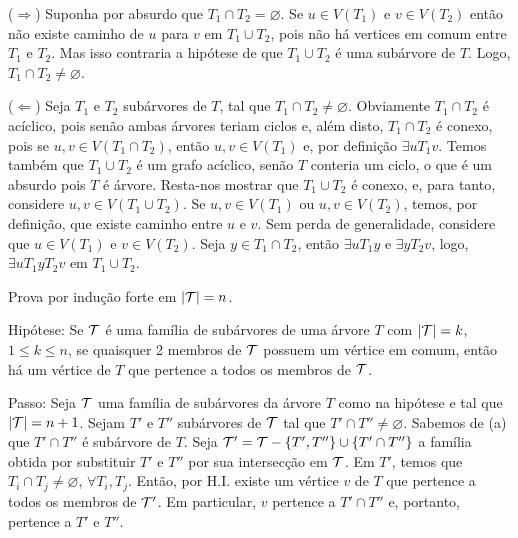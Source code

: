 
($\Rightarrow$) Suponha por absurdo que $T_1 \cap T_2 = \varnothing$.
%
Se $u \in V(T_1)$ e $v \in V(T_2)$ então não existe caminho de $u$ para $v$ em $T_1 \cup T_2$, pois não há vertices em comum entre $T_1$ e $T_2$.
%
Mas isso contraria a hipótese de que $T_1 \cup T_2$ é uma subárvore de $T$.
%
Logo, $T_1 \cap T_2 \ne \varnothing$.

($\Leftarrow$) Seja $T_1$ e $T_2$ subárvores de $T$, tal que $T_1 \cap T_2 \ne \varnothing$. 
%
Obviamente $T_1 \cap T_2$ é acíclico, pois senão ambas árvores teriam ciclos e, além disto, $T_1 \cap T_2$ é conexo, pois se $u,v \in V(T_1 \cap T_2)$, então $u,v \in V(T_1)$ e, por definição $\exists uT_1v$.
%
Temos também que $T_1 \cup T_2$ é um grafo acíclico, senão $T$ conteria um ciclo, o que é um absurdo pois $T$ é árvore.
%
Resta-nos mostrar que $T_1 \cup T_2$ é conexo, e,  para tanto, considere $u,v \in V(T_1 \cup T_2)$.
%
Se $u,v \in V(T_1)$ ou $u,v \in V(T_2)$, temos, por definição, que existe caminho entre $u$ e $v$.
%
Sem perda de generalidade, considere que $u \in V(T_1)$ e $v \in V(T_2)$.
%
Seja $y \in T_1 \cap T_2$, então $\exists uT_1y$ e $\exists yT_2v$, logo, $\exists uT_1yT_2v$ em $T_1 \cup T_2$.
\fimprova

Prova por indução forte em $|{\cal T}| = n$.

Hipótese: Se ${\cal T}$ é uma família de subárvores de uma árvore $T$ com
$|{\cal T}| = k$, $ 1 \le k \le n$, se quaisquer 2 membros de ${\cal T}$ possuem
um vértice em comum, então há um vértice de $T$ que pertence a todos os membros
de ${\cal T}$.

Passo: Seja ${\cal T}$ uma família de subárvores da árvore $T$ como na hipótese e
tal que $|{\cal T}| = n + 1$. Sejam $T'$ e $T''$ subárvores de ${\cal T}$ tal que
$T' \cap T'' \ne \varnothing$. Sabemos de (a) que $T' \cap T''$ é subárvore de $T$.
Seja ${\cal T'} = {\cal T} - \{T', T''\} \cup \{T' \cap T''\}$ a família obtida
por substituir $T'$ e $T''$ por sua intersecção em ${\cal T}$. Em $T'$, temos que
$T_i \cap T_j \ne \varnothing$, $\forall T_i, T_j$. Então, por H.I. existe um
vértice $v$ de $T$ que pertence a todos os membros de ${\cal T'}$. Em particular,
$v$ pertence a $T' \cap T''$ e, portanto, pertence a $T'$ e $T''$.
\fimprova
